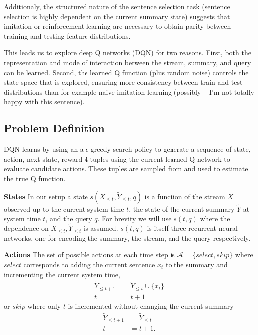 \documentclass[12pt]{article}
\begin{document}
  Additionaly, the structured nature of the sentence selection task 
  (sentence selection is
  highly dependent on the current summary state) suggests that imitation 
  or reinforcement learning are necessary to obtain parity between training
  and testing feature distributions. 

  This leads us to explore deep Q networks (DQN) for two reasons. 
  First, both the 
  representation and mode of interaction between the stream, summary, and 
  query can be learned. 
  Second, the learned Q function (plus random noise) controls the state 
  space that is explored, ensuring more consistency between train and test 
  distributions than for example naive imitation learning 
  (possibly -- I'm not totally happy with this sentence).

\subsection{Problem Definition}
   
    DQN learns by using an a $\epsilon$-greedy search policy to generate a 
    sequence of state, action, next state, reward 4-tuples using the current
    learned Q-network to evaluate candidate actions. These tuples are sampled
    from and used to estimate the true Q function.

    \textbf{States} 
    In our setup a state $s(X_{\le t},\tilde{Y}_{\le t}, q)$ is a function
    of the stream $X$ observed up to the current system time $t$, the state
    of the current summary $\tilde{Y}$ at system time $t$, and the query $q$.
    For brevity we will use $s(t,q)$ where the dependence on 
    $X_{\le t},\tilde{Y}_{\le t}$ is assumed.
    $s(t,q)$ is itself three recurrent neural networks, one for encoding 
    the summary, the stream, and the query respectively.

    \textbf{Actions} 
    The set of possible actions at each time step is 
    $\mathcal{A} = \{select, skip\}$ where $select$ corresponds to adding the 
    current sentence $x_t$ to the summary and incrementing the current system
    time, 
    \begin{align*}
        \tilde{Y}_{\le t + 1} &= \tilde{Y}_{\le t} \cup \{ x_t \} \\
        t &= t + 1    
    \end{align*}
    or $skip$ where only $t$ is incremented without changing the current 
    summary
    \begin{align*}
        \tilde{Y}_{\le t + 1} &= \tilde{Y}_{\le t}  \\
        t &= t + 1.
    \end{align*}
\end{document}
